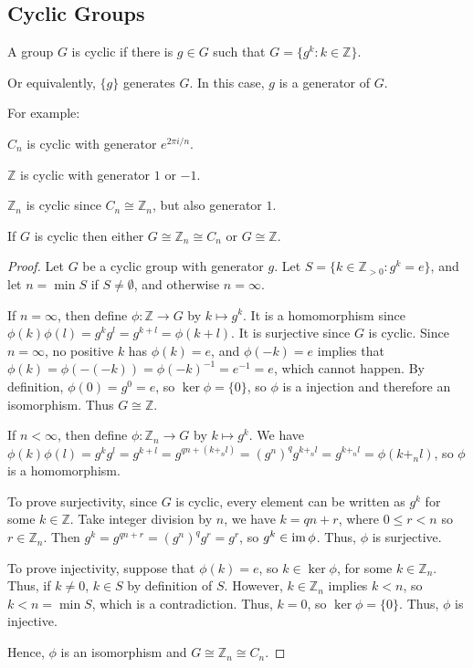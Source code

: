\documentclass[12pt]{article}
\begin{document}
\subsection*{Cyclic Groups}

\begin{definition}
    A group $G$ is cyclic if there is $g \in G$
    such that $G = \{g^k : k \in \mathbb{Z}\}$.
\end{definition}
Or equivalently, $\{g\}$ generates $G$.
In this case, $g$ is a generator of $G$.

For example: 
\begin{compactenum}[(i)]
\item $C_n$ is cyclic with generator $e^{2\pi i/n}$.
\item $\mathbb{Z}$ is cyclic with generator $1$ or $-1$.
\item $\mathbb{Z}_n$ is cyclic since $C_n \cong \mathbb{Z}_n$, but also generator $1$.
\end{compactenum}

\begin{theorem}
    If $G$ is cyclic then either
    $G \cong \mathbb{Z}_n \cong C_n$ or $G \cong \mathbb{Z}$.
\end{theorem}
\begin{proof}
    Let $G$ be a cyclic group with generator $g$.
    Let $S = \{k \in \mathbb{Z}_{>0} : g^k = e\}$,
    and let $n = \min S$ if $S \ne \emptyset$,
    and otherwise $n = \infty$.

    If $n = \infty$, then define
    $\phi : \mathbb{Z} \to G$ by $k \mapsto g^{k}$.
    It is a homomorphism since $\phi(k)\phi(l) = g^{k}g^{l} = g^{k+l} = \phi(k+l)$.
    It is surjective since $G$ is cyclic.
    Since $n = \infty$, no positive $k$ has $\phi(k) = e$,
    and $\phi(-k) = e$ implies that $\phi(k) = \phi(-(-k)) = \phi(-k)^{-1} = e^{-1} = e$,
    which cannot happen. By definition, $\phi(0) = g^{0} = e$,
    so $\ker\phi = \{0\}$, so $\phi$ is a injection
    and therefore an isomorphism. Thus $G \cong \mathbb{Z}$.

    If $n < \infty$, then define
    $\phi : \mathbb{Z}_n \to G$ by $k \mapsto g^k$.
    We have $\phi(k)\phi(l) = g^kg^l = g^{k+l} = g^{qn + (k+_nl)} = (g^n)^q g^{k+_nl} = g^{k+_nl} = \phi(k+_nl)$,
    so $\phi$ is a homomorphism. 

    To prove surjectivity, since $G$ is cyclic, every element
    can be written as $g^{k}$ for some $k \in \mathbb{Z}$.
    Take integer division by $n$, we have $k = qn + r$,
    where $0 \le r < n$ so $r \in \mathbb{Z}_n$. Then
    $g^k = g^{qn+r} = (g^n)^q g^r = g^r$, so $g^k \in \operatorname{im}\phi$.
    Thus, $\phi$ is surjective.

    To prove injectivity, suppose that $\phi(k)=e$, 
    so $k\in\ker\phi$, for some $k\in\mathbb{Z}_n$.
    Thus, if $k \ne 0$, $k \in S$ by definition of $S$.
    However, $k \in \mathbb{Z}_n$ implies $k < n$,
    so $k < n = \min S$, which is a contradiction.
    Thus, $k = 0$, so $\ker\phi = \{0\}$.
    Thus, $\phi$ is injective.

    Hence, $\phi$ is an isomorphism and $G \cong \mathbb{Z}_n \cong C_n$.
\end{proof}
\end{document}
